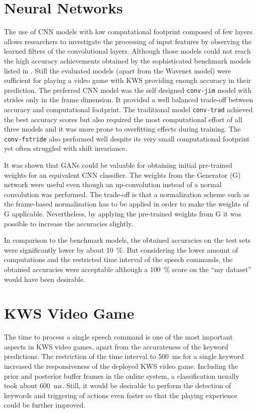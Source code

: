 \section{Neural Networks}
The use of CNN models with low computational footprint composed of few layers allows researchers to investigate the processing of input features by observing the learned filters of the convolutional layers.
Although those models could not reach the high accuracy achievements obtained by the sophisticated benchmark models listed in .
Still the evaluated models (apart from the Wavenet model) were sufficient for playing a video game with KWS providing enough accuracy in their prediction.
The preferred CNN model was the self designed \texttt{conv-jim} model with strides only in the frame dimension.
It provided a well balanced trade-off between accuracy and computational footprint.
The traditional model \texttt{conv-trad} achieved the best accuracy scores but also required the most computational effort of all three models and it was more prone to overfitting effects during training.
The \texttt{conv-fstride} also performed well despite its very small computational footprint yet often struggled with shift invariance.

It was shown that GANs could be valuable for obtaining initial pre-trained weights for an equivalent CNN classifier.
The weights from the Generator (G) network were useful even though an up-convolution instead of a normal convolution was performed.
The trade-off is that a normalization scheme such as the frame-based normalization has to be applied in order to make the weights of G applicable.
Nevertheless, by applying the pre-trained weights from G it was possible to increase the accuracies slightly.

In comparison to the benchmark models, the obtained accuracies on the test sets were significantly lower by about \SI{10}{\percent}.
But considering the lower amount of computations and the restricted time interval of the speech commands, the obtained accuracies were acceptable although a \SI{100}{\percent} score on the \enquote{my dataset} would have been desirable.



\section{KWS Video Game}
The time to process a single speech command is one of the most important aspects in KWS video games, apart from the accurateness of the keyword predictions.
The restriction of the time interval to \SI{500}{\milli\second} for a single keyword increased the responsiveness of the deployed KWS video game.
Including the prior and posterior buffer frames in the online system, a classification usually took about \SI{600}{\milli\second}.
Still, it would be desirable to perform the detection of keywords and triggering of actions even faster so that the playing experience could be further improved.

